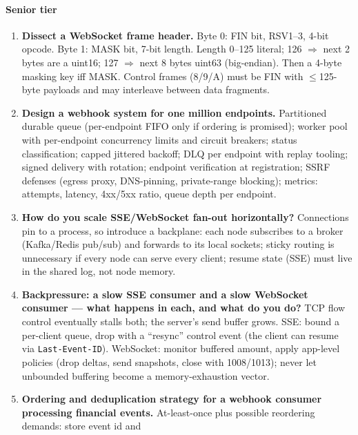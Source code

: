 \paragraph{Senior tier}

\begin{enumerate}[label=\textbf{Q\arabic*.}, leftmargin=1.6cm, start=23]
  \item \textbf{Dissect a WebSocket frame header.}
        Byte 0: FIN bit, RSV1--3, 4-bit opcode. Byte 1: MASK bit, 7-bit
        length. Length 0--125 literal; 126 $\Rightarrow$ next 2 bytes are a
        uint16; 127 $\Rightarrow$ next 8 bytes uint63 (big-endian). Then a
        4-byte masking key iff MASK. Control frames (8/9/A) must be FIN with
        $\le$125-byte payloads and may interleave between data fragments.
  \item \textbf{Design a webhook system for one million endpoints.}
        Partitioned durable queue (per-endpoint FIFO only if ordering is
        promised); worker pool with per-endpoint concurrency limits and
        circuit breakers; status classification; capped jittered backoff;
        DLQ per endpoint with replay tooling; signed delivery with rotation;
        endpoint verification at registration; SSRF defenses (egress proxy,
        DNS-pinning, private-range blocking); metrics: attempts, latency,
        4xx/5xx ratio, queue depth per endpoint.
  \item \textbf{How do you scale SSE/WebSocket fan-out horizontally?}
        Connections pin to a process, so introduce a backplane: each node
        subscribes to a broker (Kafka/Redis pub/sub) and forwards to its
        local sockets; sticky routing is unnecessary if every node can serve
        every client; resume state (SSE) must live in the shared log, not
        node memory.
  \item \textbf{Backpressure: a slow SSE consumer and a slow WebSocket
        consumer --- what happens in each, and what do you do?}
        TCP flow control eventually stalls both; the server's send buffer
        grows. SSE: bound a per-client queue, drop with a ``resync'' control
        event (the client can resume via \texttt{Last-Event-ID}). WebSocket:
        monitor buffered amount, apply app-level policies (drop deltas, send
        snapshots, close with 1008/1013); never let unbounded buffering
        become a memory-exhaustion vector.
  \item \textbf{Ordering and deduplication strategy for a webhook consumer
        processing financial events.}
        At-least-once plus possible reordering demands: store event id and

\end{enumerate}
